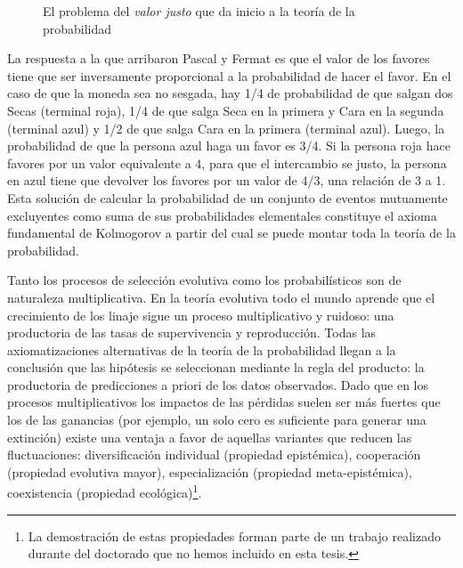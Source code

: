 \documentclass[a4paper,10pt]{book}
\theoremstyle{definition}
\begin{document}
\begin{figure}[ht!]
    \centering
    \caption{El problema del \emph{valor justo} que da inicio a la teor\'ia de la probabilidad}
    \label{fig:pascal-fermat}
\end{figure}

La respuesta a la que arribaron Pascal y Fermat es que el valor de los favores tiene que ser inversamente proporcional a la probabilidad de hacer el favor.
%
En el caso de que la moneda sea no sesgada, hay 1/4 de probabilidad de que salgan dos Secas (terminal roja), 1/4 de que salga Seca en la primera y Cara en la segunda (terminal azul) y 1/2 de que salga Cara en la primera (terminal azul).
%
Luego, la probabilidad de que la persona azul haga un favor es 3/4.
%
Si la persona roja hace favores por un valor equivalente a 4, para que el intercambio se justo, la persona en azul tiene que devolver los favores por un valor de 4/3, una relaci\'on de 3 a 1.
%
Esta solución de calcular la probabilidad de un conjunto de eventos mutuamente excluyentes como suma de sus probabilidades elementales constituye el axioma fundamental de Kolmogorov a partir del cual se puede montar toda la teor\'ia de la probabilidad.


Tanto los procesos de selección evolutiva como los probabilísticos son de naturaleza multiplicativa.
%
En la teoría evolutiva todo el mundo aprende que el crecimiento de los linaje sigue un proceso multiplicativo y ruidoso: una productoria de las tasas de supervivencia y reproducción.
%
Todas las axiomatizaciones alternativas de la teoría de la probabilidad llegan a la conclusión que las hipótesis se seleccionan mediante la regla del producto: la productoria de predicciones a priori de los datos observados.
%
Dado que en los procesos multiplicativos los impactos de las pérdidas suelen ser más fuertes que los de las ganancias (por ejemplo, un solo cero es suficiente para generar una extinción) existe una ventaja a favor de aquellas variantes que reducen las fluctuaciones: diversificación individual (propiedad epistémica), cooperación (propiedad evolutiva mayor), especialización (propiedad meta-epistémica), coexistencia (propiedad ecológica)\footnote{La demostración de estas propiedades forman parte de un trabajo realizado durante del doctorado que no hemos incluido en esta tesis. }.
\end{document}
